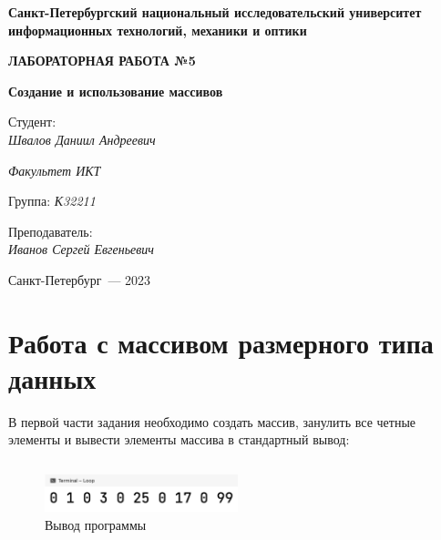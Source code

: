 \documentclass[a4paper,14pt]{extarticle}
\numberwithin{figure}{section}
\begin{document}
\begin{titlepage}
    \vspace{0pt plus2fill}
    \noindent

    \vspace{0pt plus6fill}
    \begin{center}
        \textbf{\large{Санкт-Петербургский национальный исследовательский университет информационных
                технологий, механики и оптики}}

        \vspace{0pt plus2fill}
        \textbf{\Large{ЛАБОРАТОРНАЯ РАБОТА №5}}

        \vspace{0pt plus2fill}
        \textbf{\large{Создание и использование массивов}}
    \end{center}

    \vspace{0pt plus8fill}
    \begin{flushright}
        Студент: \\
        \textit{Швалов Даниил Андреевич}

        \textit{Факультет ИКТ}

        Группа: \textit{К32211}

        Преподаватель: \\
        \textit{Иванов Сергей Евгеньевич}
    \end{flushright}

    \vspace{0pt plus4fill}
    \begin{center}
        {Санкт-Петербург~--- 2023}
    \end{center}
\end{titlepage}

\section{Работа с массивом размерного типа данных}

В первой части задания необходимо создать массив, занулить все четные элементы и вывести элементы массива в стандартный вывод:
\inputminted{csharp}{../Loop/Loop/Program.cs}

\begin{figure}[H]
    \centering
    \includegraphics[width=0.5\textwidth]{images/task-1-1.png}
    \caption{Вывод программы}
\end{figure}
\end{document}
